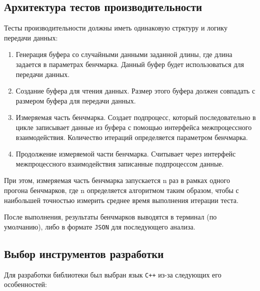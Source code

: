 \documentclass[14pt, russian]{scrartcl}
\begin{document}
\subsection{Архитектура тестов производительности}

Тесты производительности должны иметь одинаковую стрктуру и логику передачи
данных:

\begin{enumerate}
  \item Генерация буфера со случайными данными заданной длины, где длина
        задается в параметрах бенчмарка. Данный буфер будет использоваться для
        передачи данных.
  \item Создание буфера для чтения данных. Размер этого буфера должен совпадать
        с размером буфера для передачи данных.
  \item Измеряемая часть бенчмарка. Создает подпроцесс, который последовательно
        в цикле записывает данные из буфера с помощью интерфейса межпроцессного
        взаимодействия. Количество итераций определяется параметром бенчмарка.
  \item Продолжение измеряемой части бенчмарка. Считывает через интерфейс
        межпроцессного взаимодействия записанные подпроцессом данные.
\end{enumerate}

При этом, измеряемая часть бенчмарка запускается n раз в рамках одного прогона
бенчмарков, где n определяется алгоритмом таким образом, чтобы с наибольшей
точностью измерить среднее время выполнения итерации теста.

После выполнения, результаты бенчмарков выводятся в терминал (по умолчанию),
либо в формате \verb|JSON| для последующего анализа.

\subsection{Выбор инструментов разработки}

Для разработки библиотеки был выбран язык \verb|C++|\cite{Cppreference} из-за
следующих его особенностей:
\end{document}
